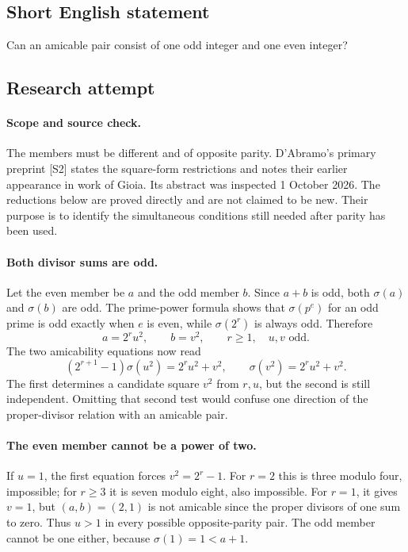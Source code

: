 \documentclass[11pt,a4paper]{article}
\begin{document}
\subsection{Short English statement}

Can an amicable pair consist of one odd integer and one even integer?

\subsection{Research attempt}

\paragraph{Scope and source check.}
The members must be different and of opposite parity. D'Abramo's
primary preprint [S2] states the square-form restrictions and notes
their earlier appearance in work of Gioia. Its abstract was inspected
1 October 2026. The reductions below are proved directly and are not
claimed to be new. Their purpose is to identify the simultaneous
conditions still needed after parity has been used.

\paragraph{Both divisor sums are odd.}
Let the even member be $a$ and the odd member $b$. Since $a+b$ is odd,
both $\sigma(a)$ and $\sigma(b)$ are odd. The prime-power formula
shows that $\sigma(p^e)$ for an odd prime is odd exactly when $e$
is even, while $\sigma(2^r)$ is always odd. Therefore
\[
 a=2^r u^2,\qquad b=v^2,\qquad r\ge1,\quad u,v\text{ odd}.
\]
The two amicability equations now read
\[
 (2^{r+1}-1)\sigma(u^2)=2^r u^2+v^2,
 \qquad \sigma(v^2)=2^r u^2+v^2.
\]
The first determines a candidate square $v^2$ from $r,u$, but the
second is still independent. Omitting that second test would confuse
one direction of the proper-divisor relation with an amicable pair.

\paragraph{The even member cannot be a power of two.}
If $u=1$, the first equation forces $v^2=2^r-1$. For $r=2$ this is
three modulo four, impossible; for $r\ge3$ it is seven modulo eight,
also impossible. For $r=1$, it gives $v=1$, but $(a,b)=(2,1)$ is not
amicable since the proper divisors of one sum to zero. Thus $u>1$ in
every possible opposite-parity pair. The odd member cannot be one
either, because $\sigma(1)=1<a+1$.
\end{document}
